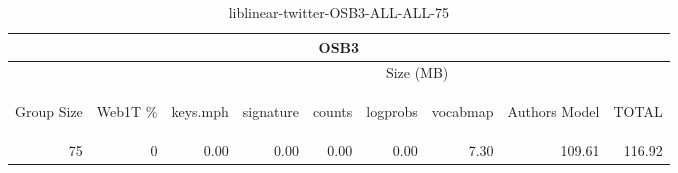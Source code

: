 \begin{center}
\begin{table}[htbp] 
 \begin{center}
\begin{tabular}{ | r | r | r | r | r | r | r | r | r |}
\hline
\multicolumn{9}{|c|}{OSB3}\\
\hline
 & & \multicolumn{7}{|c|}{Size (MB)}\\ \cline{3-9}
\begin{sideways}Group Size\end{sideways} & \begin{sideways}Web1T \% \end{sideways} & \begin{sideways}keys.mph\end{sideways} & \begin{sideways}signature\end{sideways} & \begin{sideways}counts\end{sideways} & \begin{sideways}logprobs\end{sideways} & \begin{sideways}vocabmap\end{sideways} & \begin{sideways}Authors Model \end{sideways} & \begin{sideways}TOTAL\end{sideways}\\
\hline
\multirow{0}{*}{75}
 & 0 & 0.00 & 0.00 & 0.00 & 0.00 & 7.30 & 109.61 & 116.92\\ \cline{2-9}
\hline
\end{tabular}
\caption{liblinear-twitter-OSB3-ALL-ALL-75}
\label{table:liblinear-twitter-OSB3-ALL-ALL-75}
\end{center}
 \end{table}
\end{center}

